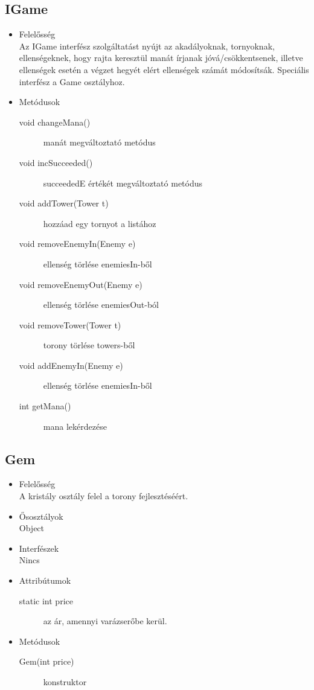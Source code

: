 \subsection{IGame}
\begin{itemize}
\item Felelősség\\
Az IGame interfész szolgáltatást nyújt az akadályoknak, tornyoknak, ellenségeknek, hogy rajta keresztül manát írjanak jóvá/csökkentsenek, illetve ellenségek esetén a végzet hegyét elért ellenségek számát módosítsák. Speciális interfész a Game osztályhoz. 

\item Metódusok\\
	\begin{description}
		\item[void changeMana()] manát megváltoztató metódus
\item[void incSucceeded()] succeededE értékét megváltoztató metódus
\item[void addTower(Tower t)] hozzáad egy tornyot a listához
\item[void removeEnemyIn(Enemy e)] ellenség törlése enemiesIn-ből
\item[void removeEnemyOut(Enemy e)] ellenség törlése enemiesOut-ból
\item[void removeTower(Tower t)] torony törlése towers-ből
\item[void addEnemyIn(Enemy e)] ellenség törlése enemiesIn-ből
\item[int getMana()] mana lekérdezése

		
	\end{description}
\end{itemize}

\subsection{Gem}
\begin{itemize}
\item Felelősség\\
A kristály osztály felel a torony fejlesztéséért.
\item Ősosztályok\\
Object
\item Interfészek\\
Nincs
\item Attribútumok\\
	\begin{description}
		\item[static int price] az ár, amennyi varázserőbe kerül.
	\end{description}
\item Metódusok\\
	\begin{description}
		
		\item[Gem(int price)] konstruktor
		
		
	\end{description}
\end{itemize}

